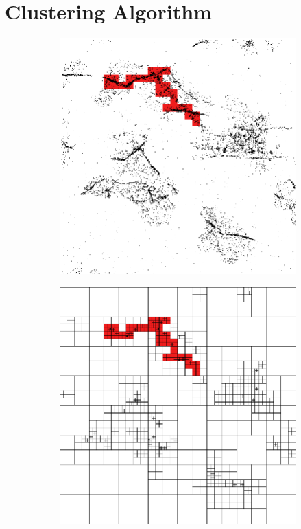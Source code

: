 %
%
%
%
%
%
%
%
%
%
%
%
%
%
%
%
%
%
%

\section{Clustering Algorithm}
\label{sec:clustering_algorithm}

\begin{figure}[tbhp]
	\centering
	\begin{subfigure}[c]{0.48\linewidth}
		\includegraphics[width=\textwidth]{single-cluster.png}
		\caption{}\label{fig:single-cluster-points}
	\end{subfigure}%
	\quad
	\begin{subfigure}[c]{0.48\linewidth}
		\includegraphics[width=\textwidth]{single-cluster-lines.png}

\end{subfigure}
\end{figure}
